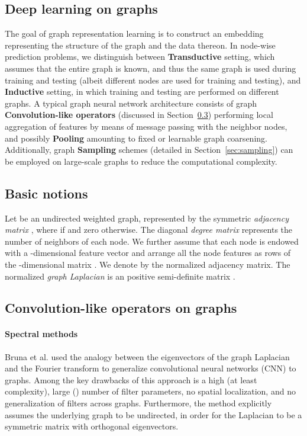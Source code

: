 \documentclass{article}
\begin{document}
\subsection{Deep learning on graphs}

The goal of graph representation learning is to construct an embedding representing the structure of the graph and the data thereon.
In node-wise prediction problems, we distinguish between {\bf Transductive} setting, which assumes that the entire graph is known, and thus the same graph is used during training and testing (albeit different nodes are used for training and testing), and {\bf Inductive} setting, in which training and testing are performed on different graphs.
A typical graph neural network architecture consists of graph {\bf Convolution-like operators} (discussed in Section~\ref{sec:convo}) performing local aggregation of features by means of message passing with the neighbor nodes, and possibly {\bf Pooling} amounting to fixed \cite{dhillon2007weighted} or learnable \cite{ying2018hierarchical,bianchi2019mincut} graph coarsening. 
Additionally, graph {\bf Sampling} schemes (detailed in Section~\ref{sec:sampling}) can be employed on large-scale graphs to reduce the computational complexity. 

\subsection{Basic notions}

Let  be an undirected weighted graph, represented by the symmetric  {\em adjacency matrix} , where  if  and zero otherwise. 
The diagonal {\em degree matrix}  represents the number of neighbors of each node. 
We further assume that each node is endowed with a -dimensional feature vector and arrange all the node features as rows of the -dimensional matrix . 
We denote by  the normalized adjacency matrix. The normalized {\em graph Laplacian} is an  positive semi-definite matrix . 

\subsection{Convolution-like operators on graphs} \label{sec:convo}

\paragraph{Spectral methods}
Bruna et al. \cite{bruna2013spectral} used the analogy between the eigenvectors of the graph Laplacian and the Fourier transform to generalize convolutional neural networks (CNN) \citep{lecun1989backpropagation} to graphs. 
Among the key drawbacks of this approach is a high (at least  complexity), 
large () number of filter parameters,  
no spatial localization, and no generalization of filters across graphs. Furthermore, the method explicitly assumes the underlying graph to be undirected, in order for the Laplacian to be a symmetric matrix with orthogonal eigenvectors. 
\end{document}
